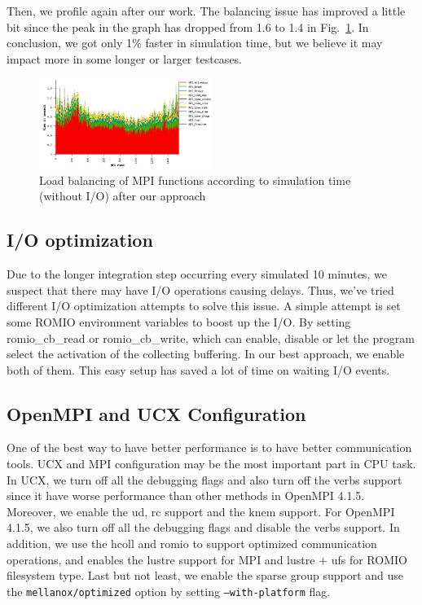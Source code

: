 Then, we profile again after our work. The balancing issue has improved a little bit since the peak in the graph has dropped from 1.6 to 1.4 in Fig.~\ref{figure:profile-after}. In conclusion, we got only 1\% faster in simulation time, but we believe it may impact more in some longer or larger testcases.

\begin{figure}[h]
    \centering
    \includegraphics[width=0.5\textwidth]{profile.JPG} 
    \caption{Load balancing of MPI functions according to simulation time (without I/O) after our approach}
    \label{figure:profile-after}
\end{figure}

\subsection{I/O optimization}
Due to the longer integration step occurring every simulated 10 minutes, we suspect that there may have I/O operations causing delays. Thus, we've tried different I/O optimization attempts to solve this issue. A simple attempt is set some ROMIO environment variables to boost up the I/O. By setting romio\_cb\_read or romio\_cb\_write, which can enable, disable or let the program select the activation of the collecting buffering. In our best approach, we enable both of them. This easy setup has saved a lot of time on waiting I/O events.

\subsection{OpenMPI and UCX Configuration}
One of the best way to have better performance is to have better communication tools. UCX and MPI configuration may be the most important part in CPU task. In UCX, we turn off all the debugging flags and also turn off the verbs support since it have worse performance than other methods in OpenMPI 4.1.5. Moreover, we enable the ud, rc support and the knem support. For OpenMPI 4.1.5, we also turn off all the debugging flags and disable the verbs support. In addition, we use the hcoll and romio to support optimized communication operations, and enables the lustre support for MPI and lustre $+$ ufs for ROMIO filesystem type. Last but not least, we enable the sparse group support and use the \texttt{mellanox/optimized} option by setting \texttt{--with-platform} flag.

